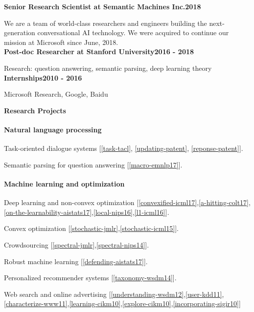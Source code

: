 \documentclass{res}
\newenvironment{my_item}{
\begin{itemize}
  \setlength{\itemsep}{0pt}
  \setlength{\parskip}{0pt}
  \setlength{\parsep}{0pt}}
{\end{itemize}
}
\begin{document}
\begin{resume}
\begin{my_item}
\end{my_item}
\vspace{-5pt}
{\bf Senior Research Scientist at Semantic Machines Inc.}\hfill\textbf{2018}
\vspace{-10pt}

We are a team of world-class researchers and engineers building the next-generation conversational AI technology. We were acquired to continue our mission at Microsoft since June, 2018.\vspace{5pt}\\
{\bf Post-doc Researcher at Stanford University}\hfill\textbf{2016 - 2018}
\vspace{-10pt}

{Research: question answering, semantic parsing, deep learning theory}\vspace{5pt}\\
{\bf Internships}\hfill\textbf{2010 - 2016}
\vspace{-10pt}

Microsoft Research, Google, Baidu

{\bf\Large Research Projects}

\paragraph{Natural language processing}
\begin{my_item}
\item Task-oriented dialogue systems [\ref{task-tacl}, \ref{updating-patent}, \ref{reponse-patent}].
\item Semantic parsing for question answering [\ref{macro-emnlp17}].
\end{my_item}

\vspace{-5pt}
\paragraph{Machine learning and optimization}
\begin{my_item}
\item Deep learning and non-convex optimization [\ref{convexified-icml17},\ref{a-hitting-colt17},\ref{on-the-learnability-aistats17},\ref{local-nips16},\ref{l1-icml16}].
\item Convex optimization [\ref{stochastic-jmlr},\ref{stochastic-icml15}].
\item Crowdsourcing [\ref{spectral-jmlr},\ref{spectral-nips14}].
\item Robust machine learning [\ref{defending-aistats17}].
\item Personalized recommender systems [\ref{taxonomy-wsdm14}].
\item Web search and online advertising [\ref{understanding-wsdm12},\ref{user-kdd11},\ref{characterize-www11},\ref{learning-cikm10},\ref{explore-cikm10},\ref{incorporating-sigir10}]
\end{my_item}


\end{resume}
\end{document}
